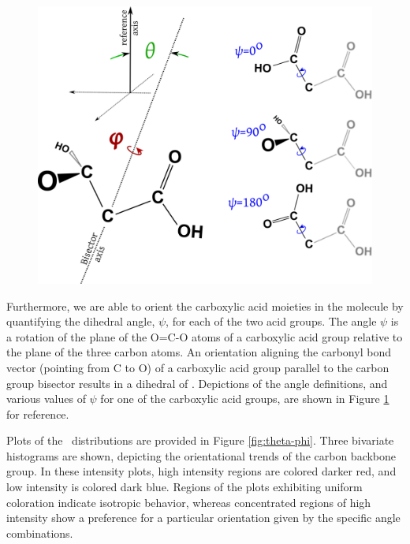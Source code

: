 \begin{figure}[h!]
	\begin{center}
		\includegraphics[scale=1.0]{images/orientation/malonic-angle-definitions.png}
		\caption{}
		\label{fig:angle-definitions}
	\end{center}
\end{figure}


Furthermore, we are able to orient the carboxylic acid moieties in the molecule by quantifying the dihedral angle, $\psi$, for each of the two acid groups. The angle $\psi$ is a rotation of the plane of the O=C-O atoms of a carboxylic acid group relative to the plane of the three carbon atoms. An orientation aligning the carbonyl bond vector (pointing from C to O) of a carboxylic acid group parallel to the carbon group bisector results in a dihedral of \degr. Depictions of the angle definitions, and various values of $\psi$ for one of the carboxylic acid groups, are shown in Figure \ref{fig:angle-definitions} for reference.

Plots of the \thetaphi~distributions are provided in Figure \ref{fig:theta-phi}. Three bivariate histograms are shown, depicting the orientational trends of the carbon backbone group. In these intensity plots, high intensity regions are colored darker red, and low intensity is colored dark blue. Regions of the plots exhibiting uniform coloration indicate isotropic behavior, whereas concentrated regions of high intensity show a preference for a particular orientation given by the specific angle combinations.

